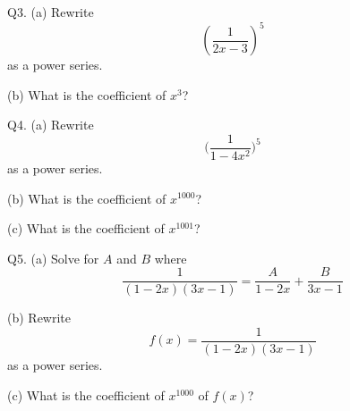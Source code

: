 \documentclass[a4paper,12pt]{article}
\begin{document}

\newpage


Q3.
(a) Rewrite
\[
\left( 
\frac{1}{2x - 3}
\right)^5
\]
as a power series. 


(b) What is the coefficient of $x^{3}$?

\SOLUTION



\newpage




Q4.
(a) Rewrite
\[
\biggl( 
\frac{1}{1 - 4x^2}
\biggr)^5
\]
as a power series. 

(b) What is the coefficient of $x^{1000}$?

(c) What is the coefficient of $x^{1001}$?


\SOLUTION


\newpage




Q5.
(a) Solve for $A$ and $B$ where
\[
\frac{1}{(1 - 2x)(3x - 1)} = \frac{A}{1 - 2x} + \frac{B}{3x - 1}
\]

(b) Rewrite 
\[
f(x) = \frac{1}{(1 - 2x)(3x - 1)} 
\]
as a power series.

(c) What is the coefficient of $x^{1000}$ of $f(x)$?

\SOLUTION


\end{document}
